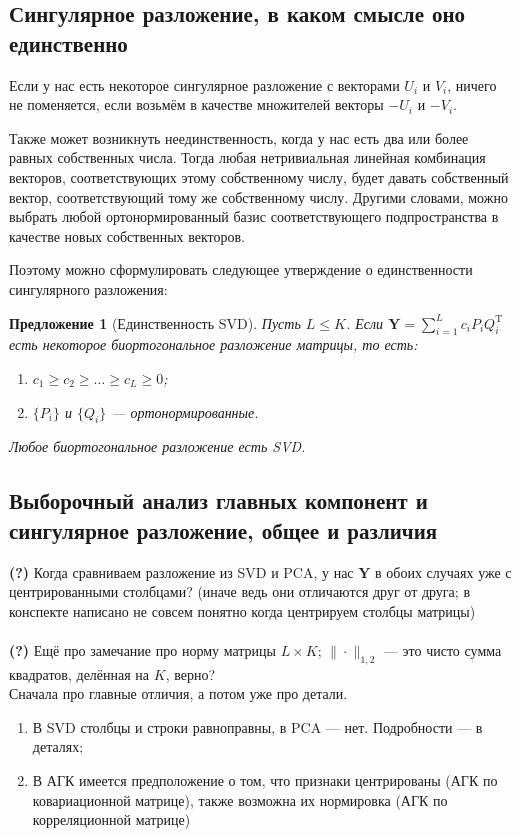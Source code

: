 \documentclass[12pt,a4paper,final]{article}
\newtheorem{proposition}{Предложение}
\begin{document}
\subsection{Сингулярное разложение, в каком смысле оно единственно}

Если у нас есть некоторое сингулярное разложение с векторами $U_i$ и $V_i$, ничего не поменяется, если возьмём в качестве множителей векторы $-U_i$ и $-V_i$.

Также может возникнуть неединственность, когда у нас есть два или более равных собственных числа. Тогда любая нетривиальная линейная комбинация векторов, соответствующих этому собственному числу, будет давать собственный вектор, соответствующий тому же собственному числу. Другими словами, можно выбрать любой ортонормированный базис соответствующего подпространства в качестве новых собственных векторов.

Поэтому можно сформулировать следующее утверждение о единственности сингулярного разложения:

\begin{proposition}[Единственность SVD]
Пусть $L\leqslant K$. Если $\bm Y = \sum_{i = 1}^{L} c_i P_i Q_i^\mathrm{T}$ есть некоторое биортогональное разложение матрицы, то есть:
\begin{enumerate}
\item $c_1 \geqslant c_2 \geqslant \ldots \geqslant c_L \geqslant 0$;
\item $\{P_i\}$ и $\{Q_i\}$ --- ортонормированные.
\end{enumerate}
Любое биортогональное разложение есть SVD.
\end{proposition}

\subsection{Выборочный анализ главных компонент и сингулярное разложение, общее и различия}

\textbf{(?)} Когда сравниваем разложение из SVD и PCA, у нас $\bm Y$ в обоих случаях уже с центрированными столбцами? (иначе ведь они отличаются друг от друга; в конспекте написано не совсем понятно когда центрируем столбцы матрицы)
\\~\\
\textbf{(?)} Ещё про замечание про норму матрицы $L \times K$; $\|\cdot\|_{1, 2}$ --- это чисто сумма квадратов, делённая на $K$, верно?
\\

\noindent Сначала про главные отличия, а потом уже про детали.
\begin{enumerate}
\item В SVD столбцы и строки равноправны, в PCA --- нет. Подробности --- в деталях;
\item В АГК имеется предположение о том, что признаки центрированы (АГК по ковариационной матрице), также возможна их нормировка (АГК по корреляционной матрице)
\end{enumerate}
\end{document}
